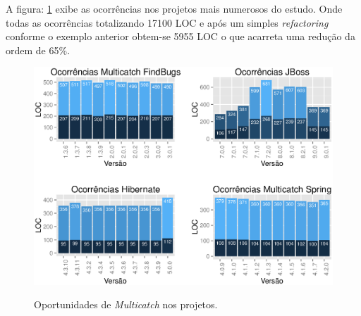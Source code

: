 A figura: \ref{fig:ocorrenciasMulticatchVersoes} exibe as ocorrências nos projetos mais numerosos do estudo. Onde todas as ocorrências totalizando 17100 \acs{LOC} e após um simples \textit{refactoring} conforme o exemplo anterior obtem-se 5955 \acs{LOC} o que acarreta uma redução da ordem de 65\%.\\

\begin{figure}[h]
	\center
	\includegraphics[scale=0.8]{Imagens/ocorrenciasMulticatchVersoes}
	\label{fig:ocorrenciasMulticatchVersoes}
	\caption{Oportunidades de \textit{Multicatch} nos projetos.}
\end{figure}
